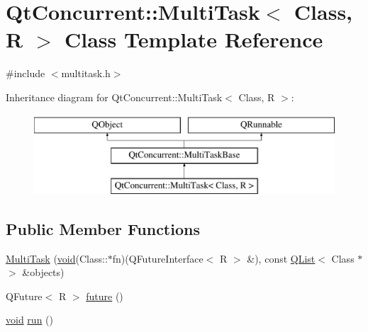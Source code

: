 \hypertarget{class_qt_concurrent_1_1_multi_task}{\section{Qt\-Concurrent\-:\-:Multi\-Task$<$ Class, R $>$ Class Template Reference}
\label{class_qt_concurrent_1_1_multi_task}
}


{\ttfamily \#include $<$multitask.\-h$>$}

Inheritance diagram for Qt\-Concurrent\-:\-:Multi\-Task$<$ Class, R $>$\-:\begin{figure}[H]
\begin{center}
\leavevmode
\includegraphics[height=3.000000cm]{class_qt_concurrent_1_1_multi_task}
\end{center}
\end{figure}
\subsection*{Public Member Functions}
\begin{DoxyCompactItemize}
\item 
\hyperlink{class_qt_concurrent_1_1_multi_task_aa839f8564fe6ee6328cd5f70de768e64}{Multi\-Task} (\hyperlink{group___u_a_v_objects_plugin_ga444cf2ff3f0ecbe028adce838d373f5c}{void}(Class\-::$\ast$fn)(Q\-Future\-Interface$<$ R $>$ \&), const \hyperlink{class_q_list}{Q\-List}$<$ Class $\ast$ $>$ \&objects)
\item 
Q\-Future$<$ R $>$ \hyperlink{class_qt_concurrent_1_1_multi_task_ab94942bb48be4f01215349658f8db85a}{future} ()
\item 
\hyperlink{group___u_a_v_objects_plugin_ga444cf2ff3f0ecbe028adce838d373f5c}{void} \hyperlink{class_qt_concurrent_1_1_multi_task_a73e6ffb5d035f73961613b55db9f4dbf}{run} ()
\end{DoxyCompactItemize}
